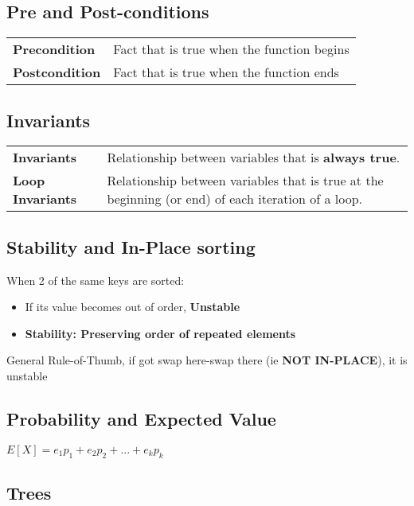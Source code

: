 \documentclass{article}
\begin{document}
    \subsection{Pre and Post-conditions}

    \begin{table}[htbp]
        \begin{tabular}{ll}
            \textbf{Precondition} & Fact that is true when the function begins\\
            \textbf{Postcondition} & Fact that is true when the function ends\\
        \end{tabular}
    \end{table}

    \subsection{Invariants}
        \begin{tabular}{ll}
            \textbf{Invariants} & Relationship between variables that is \textbf{always true}.\\
            \textbf{Loop Invariants} & Relationship between variables that is true at the beginning (or end) of each iteration of a loop.\\
        \end{tabular}


    \subsection{Stability and In-Place sorting}
    When 2 of the same keys are sorted:
    \begin{itemize}
        \item If its value becomes out of order, \textbf{Unstable}
        \item \textbf{Stability: Preserving order of repeated elements}
    \end{itemize}

    General Rule-of-Thumb, if got swap here-swap there (ie \textbf{NOT IN-PLACE}), it is unstable

    \subsection{Probability and Expected Value}

    $E[X] = e_{1}p_{1} + e_{2}p_{2} + ... + e_{k}p_{k}$


    \subsection{Trees}
\end{document}
